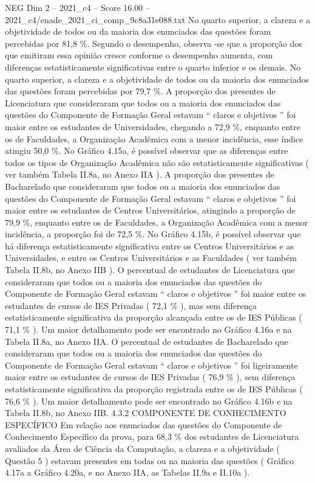 \begin{textsample}{NEG Dim 2 – 2021\_c4 – Score 16.00 – 2021\_c4/enade\_2021\_ci\_comp\_9c8a31e088.txt}
No quarto superior, a clareza e a objetividade de todos ou da maioria dos enunciados das questões foram percebidas por 81,8 \%.
Segundo o desempenho, observa -se que a proporção dos que emitiram essa opinião cresce conforme o desempenho aumenta, com diferenças estatisticamente significativas entre o quarto inferior e os demais.
No quarto superior, a clareza e a objetividade de todos ou da maioria dos enunciados das questões foram percebidas por 79,7 \%.
A proporção dos presentes de Licenciatura que consideraram que todos ou a maioria dos enunciados das questões do Componente de Formação Geral estavam “ claros e objetivos ” foi maior entre os estudantes de Universidades, chegando a 72,9 \%, enquanto entre os de Faculdades, a Organização Acadêmica com a menor incidência, esse índice atingiu 50,0 \%.
No Gráfico 4.15a, é possível observar que as diferenças entre todos os tipos de Organização Acadêmica não são estatisticamente significativas ( ver também Tabela II.8a, no Anexo IIA ).
A proporção dos presentes de Bacharelado que consideraram que todos ou a maioria dos enunciados das questões do Componente de Formação Geral estavam “ claros e objetivos ” foi maior entre os estudantes de Centros Universitários, atingindo a proporção de 79,9 \%, enquanto entre os de Faculdades, a Organização Acadêmica com a menor incidência, a proporção foi de 72,5 \%.
No Gráfico 4.15b, é possível observar que há diferença estatisticamente significativa entre os Centros Universitários e as Universidades, e entre os Centros Universitários e as Faculdades ( ver também Tabela II.8b, no Anexo IIB ).
O percentual de estudantes de Licenciatura que consideraram que todos ou a maioria dos enunciados das questões do Componente de Formação Geral estavam “ claros e objetivos ” foi maior entre os estudantes de cursos de IES Privadas ( 72,1 \% ), mas sem diferença estatisticamente significativa da proporção alcançada entre os de IES Públicas ( 71,1 \% ).
Um maior detalhamento pode ser encontrado no Gráfico 4.16a e na Tabela II.8a, no Anexo IIA.
O percentual de estudantes de Bacharelado que consideraram que todos ou a maioria dos enunciados das questões do Componente de Formação Geral estavam “ claros e objetivos ” foi ligeiramente maior entre os estudantes de cursos de IES Privadas ( 76,9 \% ), sem diferença estatisticamente significativa da proporção registrada entre os de IES Públicas ( 76,6 \% ).
Um maior detalhamento pode ser encontrado no Gráfico 4.16b e na Tabela II.8b, no Anexo IIB. 4.3.2 COMPONENTE DE CONHECIMENTO ESPECÍFICO Em relação aos enunciados das questões do Componente de Conhecimento Específico da prova, para 68,3 \% dos estudantes de Licenciatura avaliados da Área de Ciência da Computação, a clareza e a objetividade ( Questão 5 ) estavam presentes em todas ou na maioria das questões ( Gráfico 4.17a a Gráfico 4.20a, e no Anexo IIA, as Tabelas II.9a e II.10a ).

\end{textsample}
